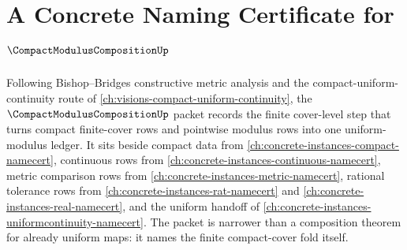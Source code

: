 \chapter{A Concrete Naming Certificate for $\CompactModulusCompositionUp$}
\label{ch:concrete-instances-compact-modulus-composition-namecert}

Following Bishop--Bridges constructive metric analysis and the compact-uniform-continuity route of \autoref{ch:visions-compact-uniform-continuity}, the $\CompactModulusCompositionUp$ packet records the finite cover-level step that turns compact finite-cover rows and pointwise modulus rows into one uniform-modulus ledger. It sits beside compact data from \autoref{ch:concrete-instances-compact-namecert}, continuous rows from \autoref{ch:concrete-instances-continuous-namecert}, metric comparison rows from \autoref{ch:concrete-instances-metric-namecert}, rational tolerance rows from \autoref{ch:concrete-instances-rat-namecert} and \autoref{ch:concrete-instances-real-namecert}, and the uniform handoff of \autoref{ch:concrete-instances-uniformcontinuity-namecert}. The packet is narrower than a composition theorem for already uniform maps: it names the finite compact-cover fold itself.

